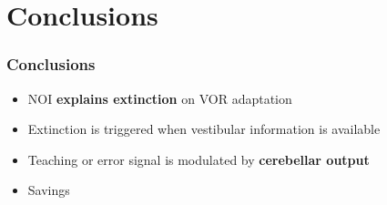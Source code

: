 \documentclass[10pt, compress]{beamer}
\begin{document}

\section{Conclusions}

\begin{frame}[fragile]
  \frametitle{Conclusions}
  \begin{itemize}
    \item NOI \textbf{explains extinction} on VOR adaptation
    \item Extinction is triggered when vestibular information is available
    \item Teaching or error signal is modulated by \textbf{cerebellar output}
    \item Savings
  \end{itemize}
\end{frame}
\end{document}
